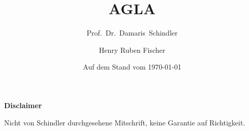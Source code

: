\documentclass[numberindividually]{hrflecture}
\title{AGLA \texorpdfstring{\Romannum{2}}{2}}
\subtitle{Prof.~Dr.~Damaris~Schindler}
\date{Auf dem Stand vom \today}
\author{Henry Ruben Fischer}
\begin{document}
\maketitle

\newpage
\textbf{Disclaimer}
\vspace{1cm}

Nicht von Schindler durchgesehene Mitschrift, keine Garantie auf Richtigkeit.

\newpage
\tableofcontents
\newpage


\end{document}
